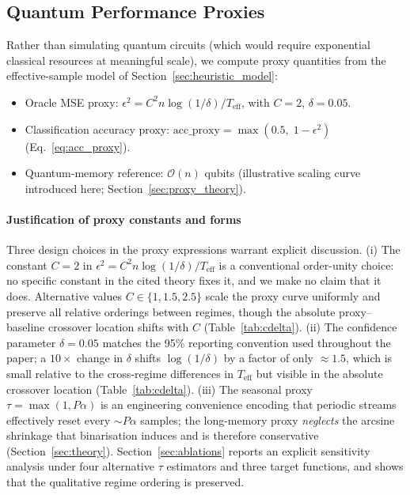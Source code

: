 \documentclass[sensors,article,submit,pdftex,moreauthors]{Definitions/mdpi}
\newcommand{\bigO}{\mathcal{O}}
\newcommand{\Teff}{T_{\mathrm{eff}}}
\begin{document}
\subsection{Quantum Performance Proxies}
\label{sec:quantum_proxies}

Rather than simulating quantum circuits (which would require exponential classical resources at meaningful scale), we compute proxy quantities from the effective-sample model of Section~\ref{sec:heuristic_model}:
\begin{itemize}
    \item Oracle MSE proxy: $\epsilon^2 = C^2 n \log(1/\delta) / \Teff$, with $C = 2$, $\delta = 0.05$.
    \item Classification accuracy proxy: $\mathrm{acc\_proxy} = \max(0.5,\; 1 - \epsilon^2)$ (Eq.~\ref{eq:acc_proxy}).
    \item Quantum-memory reference: $\bigO(n)$ qubits (illustrative scaling curve introduced here; Section~\ref{sec:proxy_theory}).
\end{itemize}

\paragraph{Justification of proxy constants and forms} Three design choices in the proxy expressions warrant explicit discussion.
(i) The constant $C = 2$ in $\epsilon^2 = C^2 n \log(1/\delta) / \Teff$ is a conventional order-unity choice: no specific constant in the cited theory fixes it, and we make no claim that it does. Alternative values $C \in \{1, 1.5, 2.5\}$ scale the proxy curve uniformly and preserve all relative orderings between regimes, though the absolute proxy--baseline crossover location shifts with $C$ (Table~\ref{tab:cdelta}).
(ii) The confidence parameter $\delta = 0.05$ matches the 95\% reporting convention used throughout the paper; a $10\times$ change in $\delta$ shifts $\log(1/\delta)$ by a factor of only ${\approx}1.5$, which is small relative to the cross-regime differences in $\Teff$ but visible in the absolute crossover location (Table~\ref{tab:cdelta}).
(iii) The seasonal proxy $\tau = \max(1, P\alpha)$ is an engineering convenience encoding that periodic streams effectively reset every ${\sim}P\alpha$ samples; the long-memory proxy \emph{neglects} the arcsine shrinkage that binarisation induces \citep{vanvleck1966spectrum} and is therefore conservative (Section~\ref{sec:theory}). Section~\ref{sec:ablations} reports an explicit sensitivity analysis under four alternative $\tau$ estimators and three target functions, and shows that the qualitative regime ordering is preserved.
\end{document}
